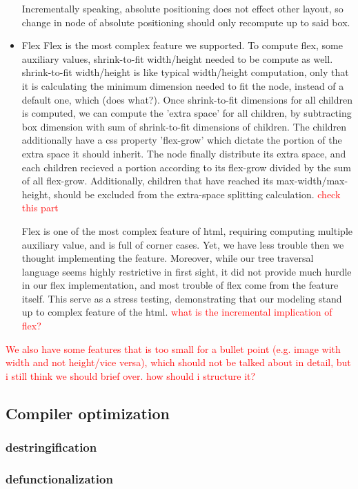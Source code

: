 \documentclass[format=acmsmall, review=false, screen=true]{acmart}
\newcommand\todo[1]{\textcolor{red}{#1}}
\begin{document}
\begin{itemize}
	Incrementally speaking, absolute positioning does not effect other layout, so change in node of absolute positioning should only recompute up to said box.
	\item Flex
	Flex is the most complex feature we supported. To compute flex, some auxiliary values, shrink-to-fit width/height needed to be compute as well. shrink-to-fit width/height is like typical width/height computation, only that it is calculating the minimum dimension needed to fit the node, instead of a default one, which (does what?). Once shrink-to-fit dimensions for all children is computed, we can compute the 'extra space' for all children, by subtracting box dimension with sum of shrink-to-fit dimensions of children. The children additionally have a css property 'flex-grow' which dictate the portion of the extra space it should inherit. The node finally distribute its extra space, and each children recieved a portion according to its flex-grow divided by the sum of all flex-grow. Additionally, children that have reached its max-width/max-height, should be excluded from the extra-space splitting calculation. \todo{check this part}
	
	Flex is one of the most complex feature of html, requiring computing multiple auxiliary value, and is full of corner cases. Yet, we have less trouble then we thought implementing the feature. Moreover, while our tree traversal language seems highly restrictive in first sight, it did not provide much hurdle in our flex implementation, and most trouble of flex come from the feature itself. This serve as a stress testing, demonstrating that our modeling stand up to complex feature of the html.
	\todo{what is the incremental implication of flex?}
\end{itemize}
\todo{We also have some features that is too small for a bullet point (e.g. image with width and not height/vice versa), which should not be talked about in detail, but i still think we should brief over. how should i structure it?}
\subsection{Compiler optimization}
\subsubsection{destringification}
\subsubsection{defunctionalization}
\end{document}
